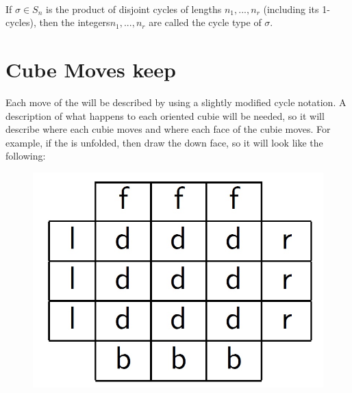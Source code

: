 \paragraph{}

If $\sigma \in S_n$ is the product of disjoint cycles of lengths $n_1, . . . , n_r$ (including its 1-cycles),
then the integers$ n_1, . . . , n_r$ are called the cycle type of $\sigma$.
\pagebreak{}

\section{Cube Moves keep}

Each move of the \rubik{} will be described by using a slightly modified cycle notation. A description of what happens to each oriented cubie will be needed, so it will describe where each cubie moves and where each face of the cubie moves. For example, if the \rubik{} is unfolded, then draw the down face, so it will look like the following:


\begin{figure}[h]
	\centering	
		\includegraphics [scale=0.2]{input/pics/rubiks1.jpg}
			\caption{}
	\label{fig:rubiks1}
\end{figure}

